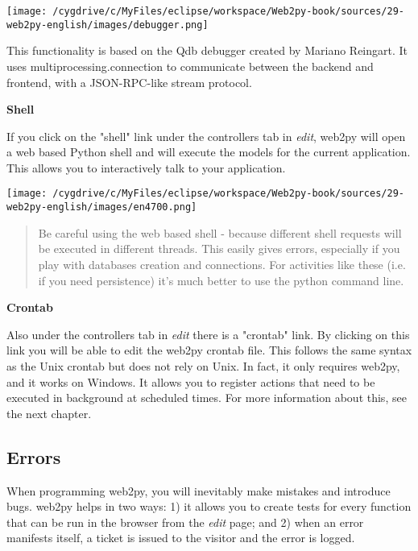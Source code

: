 \documentclass[justified,sixbynine,notoc]{tufte-book}
\def\inxx#1{\index{#1}}
\begin{document}
\begin{fullwidth}
\goodbreak\begin{center}\texttt{[image: /cygdrive/c/MyFiles/eclipse/workspace/Web2py-book/sources/29-web2py-english/images/debugger.png]}\end{center}


This functionality is based on the Qdb debugger created by Mariano Reingart.
It uses multiprocessing.connection to communicate between the backend
and frontend, with a JSON-RPC-like stream protocol.~\cite{qdb}

{\bf Shell}

If you click on the "shell" link under the controllers tab in {\it edit}, web2py will open a web based Python shell and will execute the models for the current application. This allows you to interactively talk to your application.


\goodbreak\begin{center}\texttt{[image: /cygdrive/c/MyFiles/eclipse/workspace/Web2py-book/sources/29-web2py-english/images/en4700.png]}\end{center}


\begin{quote}Be careful using the web based shell - because different shell requests will be executed in different threads. This easily gives errors, especially if you play with databases
creation and connections. For activities like these (i.e. if you need persistence) it's much better to use the python command line.\end{quote}
{\bf Crontab}

Also under the controllers tab in {\it edit} there is a "crontab" link. By clicking on this link you will be able to edit the web2py crontab file. This follows the same syntax as the Unix crontab but does not rely on Unix. In fact, it only requires web2py, and it works on Windows. It allows you to register actions that need to be executed in background at scheduled times.
For more information about this, see the next chapter.

\goodbreak\subsection{Errors}

\inxx{errors}

When programming web2py, you will inevitably make mistakes and introduce bugs. web2py helps in two ways: 1) it allows you to create tests for every function that can be run in the browser from the {\it edit} page; and 2) when an error manifests itself, a ticket is issued to the visitor and the error is logged.


\end{fullwidth}
\end{document}
